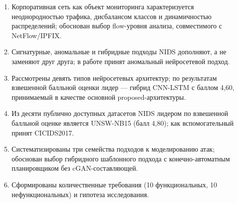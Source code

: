 \begin{enumerate}
    \item Корпоративная сеть как объект мониторинга характеризуется
    неоднородностью трафика, дисбалансом классов и динамичностью
    распределений; обоснован выбор flow-уровня анализа,
    совместимого с NetFlow/IPFIX.
    \item Сигнатурные, аномальные и гибридные подходы NIDS
    дополняют, а не заменяют друг друга; в работе принят аномальный
    нейросетевой подход.
    \item Рассмотрены девять типов нейросетевых архитектур; по
    результатам взвешенной балльной оценки лидер --- гибрид
    CNN-LSTM с баллом 4,60, принимаемый в качестве основной
    proposed-архитектуры.
    \item Из десяти публично доступных датасетов NIDS лидером по
    взвешенной балльной оценке является UNSW-NB15 (балл 4,80);
    как вспомогательный принят CICIDS2017.
    \item Систематизированы три семейства подходов к моделированию
    атак; обоснован выбор гибридного шаблонного подхода с
    конечно-автоматным планировщиком без cGAN-составляющей.
    \item Сформированы количественные требования (10 функциональных,
    10 нефункциональных) и гипотеза исследования.
\end{enumerate}
